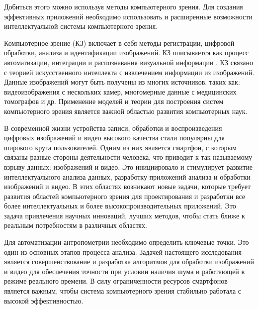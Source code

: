 Добиться этого можно используя методы компьютерного зрения. Для создания эффективных приложений необходимо использовать и расширенные возможности интеллектуальной системы компьютерного зрения.

Компьютерное зрение (КЗ) включает в себя методы регистрации, цифровой обработки, анализа и идентификации изображений. КЗ описывается как процесс автоматизации, интеграции и распознавания визуальной информации \cite{Wang2016,Maria2016,Ioan2011,Lauren2013,Saha2005,Azriel2001}. КЗ связано с теорией искусственного интеллекта с извлечением информации из изображений. Данные изображений могут быть получены из многих источников, таких как: видеоизображения с нескольких камер, многомерные данные с медицинских томографов и др. Применение моделей и теории для построения систем компьютерного зрения является важной областью развития компьютерных наук.

В современной жизни устройства записи, обработки и воспроизведения цифровых изображений и видео высокого качества стали популярны для широкого круга пользователей. Одним из них является смартфон, с которым связаны разные стороны деятельности человека, что приводит к так называемому взрыву данных: изображений и видео. Это инициировало и стимулирует развитие интеллектуального анализа данных, разработку приложений анализа и обработки изображений и видео. В этих областях возникают новые задачи, которые требует развития областей компьютерного зрения для проектирования и разработки все более интеллектуальных и более высокопроизводительных приложений. Это задача привлечения научных инноваций, лучших методов, чтобы стать ближе к реальным потребностям в различных областях.

Для автоматизации антропометрии необходимо определить ключевые точки. Это один из основных этапов процесса анализа. Задачей настоящего исследования является совершенствование и разработка алгоритмов для обработки изображений и видео для обеспечения точности при условии наличия шума и работающей в режиме реального времени. В силу ограниченности ресурсов смартфонов является важным, чтобы система компьютерного зрения стабильно работала с высокой эффективностью.



